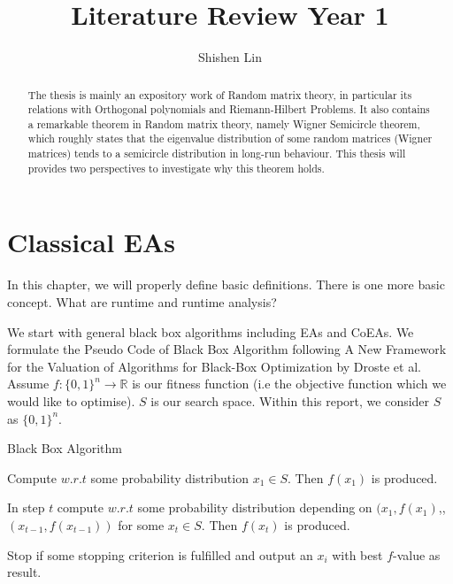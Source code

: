 \documentclass[a4paper,11pt]{report}
\title{Literature Review Year 1}
\author{Shishen Lin }
\date{}
\theoremstyle{plain} %
\theoremstyle{definition} %
\theoremstyle{remark} %
\begin{document}

\maketitle

\clearpage{\pagestyle{empty}\cleardoublepage}
\setcounter{page}{0}
\begin{abstract}
\par The thesis is mainly an expository work of Random matrix theory, in particular its relations with Orthogonal polynomials and Riemann-Hilbert Problems. It also contains a remarkable theorem in Random matrix theory, namely Wigner Semicircle theorem, which roughly states that the eigenvalue distribution of some random matrices (Wigner matrices) tends to a semicircle distribution in long-run behaviour. This thesis will provides two perspectives to investigate why this theorem holds. 


\end{abstract}

\cleardoublepage

\tableofcontents 

\chapter{Classical EAs}
In this chapter, we will properly define basic definitions.  There is one more basic concept. What are runtime and runtime analysis? 
\par We start with general black box algorithms including EAs and CoEAs. We formulate the Pseudo Code of Black Box Algorithm following A New Framework for the Valuation of Algorithms for Black-Box Optimization \citep{droste_new_nodate} by Droste et al. Assume $f:\{0,1\}^n \rightarrow \mathbb{R}$ is our fitness function (i.e the objective function which we would like to optimise). $S$ is our search space. Within this report, we consider $S$ as $\{0,1\}^n$.
\begin{algorithm}
\caption{Black Box Algorithm}

    Compute $w.r.t$ some probability distribution $x_{1}\in S$. Then $f(x_{1})$ is produced.
    
    In step $t$ compute $w.r.t$ some probability distribution depending on $(x_{1},f(x_{1})$,\cdots  ,$(x_{t-1},f(x_{t-1}))$ for some $x_{t}\in S$. Then $f(x_{t})$ is produced.
    
    Stop if some stopping criterion is fulfilled and output an $x_{i}$ with best $f$-value as result.
    
\end{algorithm}
\end{document}
